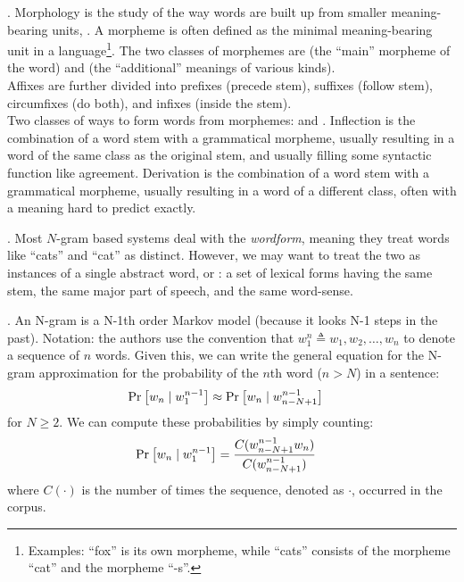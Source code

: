 \documentclass[11pt]{article}
\newcommand\myspace[1][]{\vspace{#1\bigskipamount}}
\newcommand\p{\Needspace{10\baselineskip} \noindent}
\begin{document}

\p {}. Morphology is the study of the way words are built up from smaller meaning- bearing units, . A morpheme is often defined as the minimal meaning-bearing unit in a language\footnote{Examples: ``fox'' is its own morpheme, while ``cats'' consists of the morpheme ``cat'' and the morpheme ``-s''.}. The two classes of morphemes are  (the ``main'' morpheme of the word) and  (the ``additional'' meanings of various kinds). \\

\p Affixes are further divided into prefixes (precede stem), suffixes (follow stem), circumfixes (do both), and infixes (inside the stem). \\

\p Two classes of ways to form words from morphemes:  and . Inflection is the combination of a word stem with a grammatical morpheme, usually resulting in a word of the same class as the original stem, and usually filling some syntactic function like agreement. Derivation is the combination of a word stem with a grammatical morpheme, usually resulting in a word of a different class, often with a meaning hard to predict exactly.



\p {}. Most $N$-gram based systems deal with the \textit{wordform}, meaning they treat words like ``cats'' and ``cat'' as distinct. However, we may want to treat the two as instances of a single abstract word, or : a set of lexical forms having the same stem, the same major part of speech, and the same word-sense.

\myspace
\p {}. An N-gram is a N-1th order Markov model (because it looks N-1 steps in the past). Notation: the authors use the convention that $w_1^n \triangleq w_1, w_2, \ldots, w_n$ to denote a sequence of $n$ words. Given this, we can write the general equation for the N-gram approximation for the probability of the $n$th word ($n > N$) in a sentence:
\begin{align}
	\text{Pr}_{}\left[w_n \mid w_1^{n -1}\right] &\approx \text{Pr}_{}\left[w_n \mid w_{n - N + 1}^{n - 1}    \right]
\end{align}
for $N \ge 2$. We can compute these probabilities by simply counting:
\begin{align}
	\text{Pr}_{}\left[w_n \mid w_1^{n -1}\right] 
	&= \frac{C(w_{n - N + 1}^{n - 1}w_n)}{C(w_{n - N + 1}^{n - 1})  }
\end{align}
where $C(\cdot)$ is the number of times the sequence, denoted as $\cdot$, occurred in the corpus.
\end{document}
